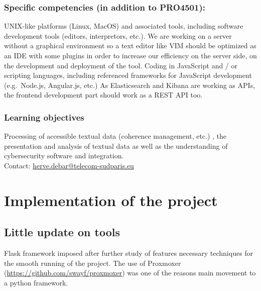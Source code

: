 \subsubsection{Specific competencies (in addition to PRO4501):}
UNIX-like platforms (Linux, MacOS) and associated tools, including
software development tools (editors, interpretors, etc.). We are working on a
server without a graphical environment so a text editor like VIM should be
optimized as an IDE with some plugins in order to increase our efficiency on the 
server side, on the development and deployment of the tool. 
Coding in JavaScript and / or scripting languages, including referenced 
frameworks for JavaScript development (e.g.~Node.js, Angular.js, etc.)
As Elasticsearch and Kibana are working as APIs, the frontend development part should work
as a REST API too.

\subsubsection{Learning objectives}
Processing of accessible textual data (coherence management, etc.)
, the presentation and analysis of textual data as well as the understanding of cybersecurity
software and integration. \\
Contact: \url{herve.debar@telecom-sudparis.eu} 

%
%

\pagebreak

\section{Implementation of the project}

\subsection{Little update on tools}

Flask framework imposed after further study of features
necessary techniques for the smooth running of the project. The use of
Proxmoxer (\url{https://github.com/swayf/proxmoxer}) was one of the reasons
main movement to a python framework. \\

